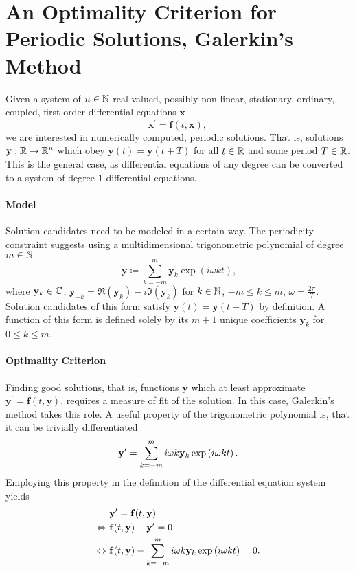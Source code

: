\section{An Optimality Criterion for Periodic Solutions, Galerkin's Method}

Given a system of $n \in \mathbb{N}$ real valued, possibly non-linear, stationary, ordinary, coupled, first-order differential equations $\mathbf{x}$
	\begin{equation} \label{eq:SDE}
		\mathbf{x}^\prime = \mathbf{f}(t, \mathbf{x}) \text{, }
	\end{equation}
we are interested in numerically computed, periodic solutions.
That is, solutions $\mathbf{y}: \mathbb{R} \to \mathbb{R}^n$ which obey $\mathbf{y}(t) = \mathbf{y}(t+T)$ for all $t \in \mathbb{R}$ and some period $T \in \mathbb{R}$.
This is the general case, as differential equations of any degree can be converted to a system of degree-$1$ differential equations.

\paragraph{Model} Solution candidates need to be modeled in a certain way.
The periodicity constraint suggests using a multidimensional trigonometric polynomial of degree $m \in \mathbb{N}$
	\[
		\mathbf{y} \coloneqq \sum_{k = -m}^m \mathbf{y}_k \exp\left(i \omega k t\right) \text{,}
	\]
where $\mathbf{y}_k \in \mathbb{C}$, $\mathbf{y}_{-k} = \Re(\mathbf{y}_k) - i \Im(\mathbf{y}_k)$ for $k \in \mathbb{N}$, $-m \le k \le m$, $\omega = \frac{2\pi}T$.
Solution candidates of this form satisfy $\mathbf{y}(t) = \mathbf{y}(t+T)$ by definition.
A function of this form is defined solely by its $m+1$ unique coefficients $\mathbf{y}_k$ for $0 \le k \le m$.

\paragraph{Optimality Criterion} Finding good solutions, that is, functions $\mathbf{y}$ which at least approximate $\mathbf{y}^\prime = \mathbf{f}(t, \mathbf{y})$, requires a measure of fit of the solution.
In this case, Galerkin's method takes this role.
A useful property of the trigonometric polynomial is, that it can be trivially differentiated
	\[
		\mathbf{y}^\prime = \sum_{k = -m}^m i \omega k \mathbf{y}_k \exp\left(i \omega k t\right) \text.
	\]
Employing this property in the definition of the differential equation system yields
	\begin{align*}
			& \mathbf{y}^\prime = \mathbf{f}(t,\mathbf{y})\\
		\Leftrightarrow\ & \mathbf{f}(t,\mathbf{y}) - \mathbf{y}^\prime = 0\\
		\Leftrightarrow\ & \mathbf{f}(t,\mathbf{y}) - \sum_{k = -m}^m i \omega k \mathbf{y}_k \exp\left(i \omega k t\right) = 0 \text.
	\end{align*}

